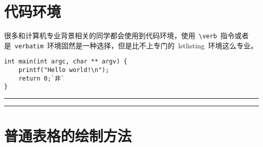 %

\section{代码环境}

很多和计算机专业背景相关的同学都会使用到代码环境，使用~\verb|\verb|~指令或者是~\verb|verbatim|~环境固然是一种选择，但是比不上专门的~lstlisting~环境这么专业。

\begin{lstlisting}
int main(int argc, char ** argv) {
    printf("Hello world!\n");
    return 0;`非`
}
\end{lstlisting}

\noindent\hrule
\vspace{0.1em}\noindent\hrule

\vspace{1em}

\section{普通表格的绘制方法}

